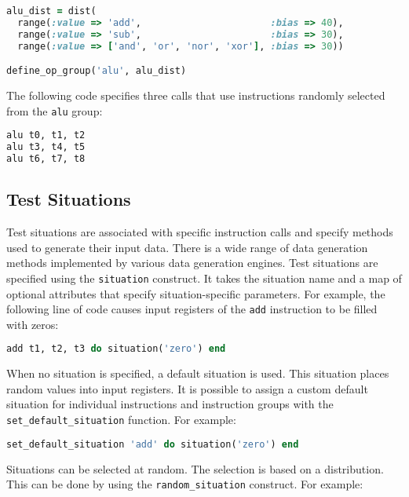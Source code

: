 \documentclass[oneside,final,12pt]{extreport}
\begin{document}
\begin{lstlisting}[language=ruby]
alu_dist = dist(
  range(:value => 'add',                       :bias => 40),
  range(:value => 'sub',                       :bias => 30),
  range(:value => ['and', 'or', 'nor', 'xor'], :bias => 30))

define_op_group('alu', alu_dist)
\end{lstlisting}

The following code specifies three calls that use instructions randomly selected
from the \texttt{alu} group:
 
\begin{lstlisting}[language=ruby]
alu t0, t1, t2
alu t3, t4, t5
alu t6, t7, t8
\end{lstlisting}

\subsection{Test Situations}

Test situations are associated with specific instruction calls and specify methods
used to generate their input data. There is a wide range of data generation methods
implemented by various data generation engines. Test situations are specified using the
{\tt situation} construct. It takes the situation name and a map of optional attributes
that specify situation-specific parameters. For example, the following line of code
causes input registers of the {\tt add} instruction to be filled with zeros:

\begin{lstlisting}[language=ruby, emph={situation}]
add t1, t2, t3 do situation('zero') end
\end{lstlisting}

When no situation is specified, a default situation is used. This situation places random
values into input registers. It is possible to assign a custom default situation for
individual instructions and instruction groups with the {\tt set{\_}default{\_}situation} function.
For example:

\begin{lstlisting}[language=ruby, emph={situation, set_default_situation}]
set_default_situation 'add' do situation('zero') end
\end{lstlisting}

Situations can be selected at random. The selection is based on a distribution. This
can be done by using the {\tt random{\_}situation} construct. For example:
\end{document}
